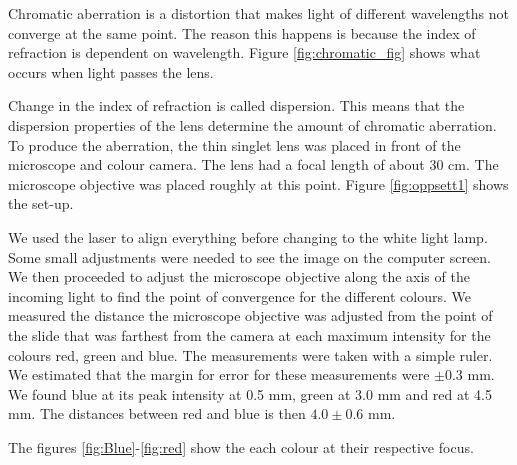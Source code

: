 Chromatic aberration is a distortion that makes light of different wavelengths not converge at the same point. The reason this happens is because the index of refraction is dependent on wavelength. Figure \vref{fig:chromatic_fig} shows what occurs when light passes the lens.


 Change in the index of refraction is called dispersion. This means that the dispersion properties of the lens determine the amount of chromatic aberration. To produce the aberration, the thin singlet lens was placed in front of the microscope and colour camera. The lens had a focal length of about 30 cm. The microscope objective was placed roughly at this point. Figure \vref{fig:oppsett1} shows the set-up. 


We used the laser to align everything before changing to the white light lamp. Some small adjustments were needed to see the image on the computer screen. We then proceeded to adjust the microscope objective along the axis of the incoming light to find the point of convergence for the different colours. We measured the distance the microscope objective was adjusted from the point of the slide that was farthest from the camera at each maximum intensity for the colours red, green and blue. The measurements were taken with a simple ruler. We estimated that the margin for error for these measurements were $\pm 0.3$ mm. We found blue at its peak intensity at 0.5 mm, green at 3.0 mm and red at 4.5 mm. The distances between red and blue is then $4.0 \pm 0.6$ mm.


The figures \vref{fig:Blue}-\vref{fig:red} show the each colour at their respective focus.